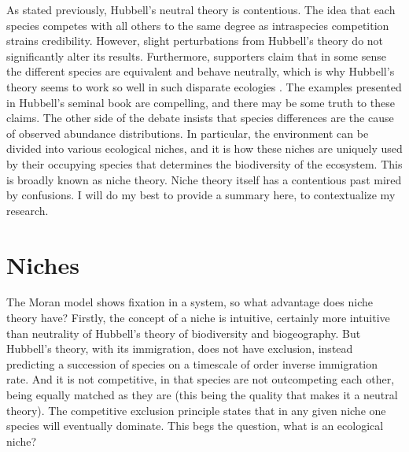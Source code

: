 As stated previously, Hubbell's neutral theory is contentious. 
The idea that each species competes with all others to the same degree as intraspecies competition strains credibility. 
However, slight perturbations from Hubbell's theory do not significantly alter its results. 
Furthermore, supporters claim that in some sense the different species are equivalent and behave neutrally, which is why Hubbell's theory seems to work so well in such disparate ecologies \cite{Hubbell2006}. 
The examples presented in Hubbell's seminal book are compelling, and there may be some truth to these claims. 
The other side of the debate insists that species differences are the cause of observed abundance distributions. 
In particular, the environment can be divided into various ecological niches, and it is how these niches are uniquely used by their occupying species that determines the biodiversity of the ecosystem. 
This is broadly known as niche theory. 
Niche theory itself has a contentious past mired by confusions. 
I will do my best to provide a summary here, to contextualize my research. 


\section{Niches}
The Moran model shows fixation in a system, so what advantage does niche theory have? 
Firstly, the concept of a niche is intuitive, certainly more intuitive than neutrality of Hubbell's theory of biodiversity and biogeography. 
But Hubbell's theory, with its immigration, does not have exclusion, instead predicting a succession of species on a timescale of order inverse immigration rate. 
And it is not competitive, in that species are not outcompeting each other, being equally matched as they are (this being the quality that makes it a neutral theory). 
The competitive exclusion principle states that in any given niche one species will eventually dominate. %
This begs the question, what is an ecological niche?

